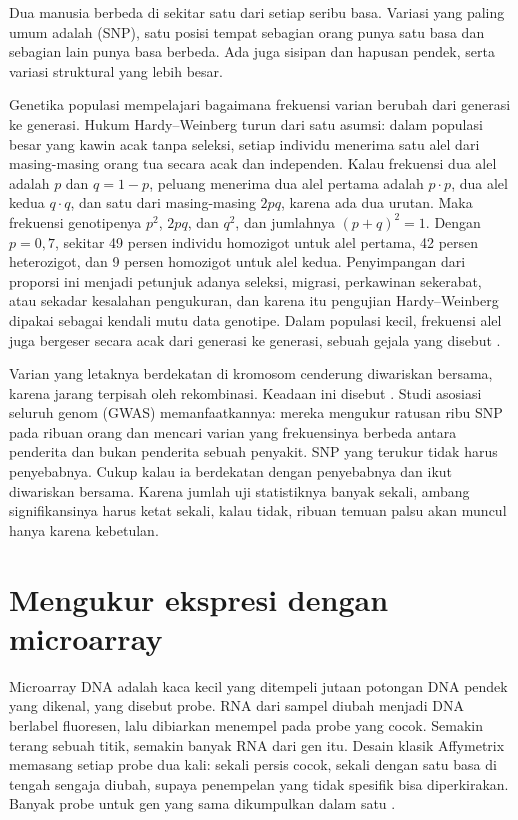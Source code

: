 Dua manusia berbeda di sekitar satu dari setiap seribu basa. Variasi yang paling umum adalah  (SNP), satu posisi tempat sebagian orang punya satu basa dan sebagian lain punya basa berbeda. Ada juga
sisipan dan hapusan pendek, serta variasi struktural yang lebih besar.

Genetika populasi mempelajari bagaimana frekuensi varian berubah dari generasi ke generasi. Hukum Hardy--Weinberg
turun dari satu asumsi: dalam populasi besar yang kawin acak tanpa seleksi, setiap individu menerima satu alel dari
masing-masing orang tua secara acak dan independen. Kalau frekuensi dua alel adalah $p$ dan $q=1-p$, peluang menerima
dua alel pertama adalah $p\cdot p$, dua alel kedua $q\cdot q$, dan satu dari masing-masing $2pq$, karena ada dua urutan.
Maka frekuensi genotipenya $p^2$, $2pq$, dan $q^2$, dan jumlahnya $(p+q)^2=1$. Dengan $p=0{,}7$, sekitar 49 persen
individu homozigot untuk alel pertama, 42 persen heterozigot, dan 9 persen homozigot untuk alel kedua. Penyimpangan
dari proporsi ini menjadi petunjuk adanya seleksi, migrasi, perkawinan sekerabat, atau sekadar kesalahan pengukuran,
dan karena itu pengujian Hardy--Weinberg dipakai sebagai kendali mutu data genotipe. Dalam populasi kecil, frekuensi
alel juga bergeser secara acak dari generasi ke generasi, sebuah gejala yang disebut .

Varian yang letaknya berdekatan di kromosom cenderung diwariskan bersama, karena jarang terpisah oleh rekombinasi.
Keadaan ini disebut . Studi asosiasi seluruh genom (GWAS) memanfaatkannya: mereka mengukur
ratusan ribu SNP pada ribuan orang dan mencari varian yang frekuensinya berbeda antara penderita dan bukan penderita
sebuah penyakit. SNP yang terukur tidak harus penyebabnya. Cukup kalau ia berdekatan dengan penyebabnya dan ikut
diwariskan bersama. Karena jumlah uji statistiknya banyak sekali, ambang signifikansinya harus ketat sekali, kalau
tidak, ribuan temuan palsu akan muncul hanya karena kebetulan.

\section{Mengukur ekspresi dengan microarray}

Microarray DNA adalah kaca kecil yang ditempeli jutaan potongan DNA pendek yang dikenal, yang disebut probe. RNA dari
sampel diubah menjadi DNA berlabel fluoresen, lalu dibiarkan menempel pada probe yang cocok. Semakin terang sebuah
titik, semakin banyak RNA dari gen itu. Desain klasik Affymetrix memasang setiap probe dua kali: sekali persis cocok,
sekali dengan satu basa di tengah sengaja diubah, supaya penempelan yang tidak spesifik bisa diperkirakan. Banyak probe
untuk gen yang sama dikumpulkan dalam satu .

